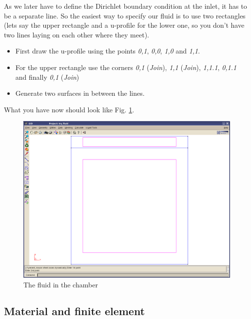 As we later have to define the Dirichlet boundary condition at the
inlet, it has to be a separate line. So the easiest way to specify
our fluid is to use two rectangles (lets say the upper rectangle and
a u-profile for the lower one, so you don't have two lines laying
on each other where they meet).

\begin{itemize}
\item First draw the u-profile using the points \emph{0,1}, \emph{0,0}, \emph{1,0} and \emph{1,1}.
\item For the upper rectangle use the corners \emph{0,1} (\emph{Join}), \emph{1,1} (\emph{Join}), \emph{1,1.1}, \emph{0,1.1} and finally \emph{0,1} (\emph{Join}) 
\item Generate two surfaces in between the lines. 
\end{itemize}
What you have now should look like Fig. \ref{tut_fsi:4.1}.

%
\begin{figure}[h]
\includegraphics[scale=0.4]{Bilder/fluid_01}


\caption{\label{tut_fsi:4.1} The fluid in the chamber}
\end{figure}



\subsection{Material and finite element}

